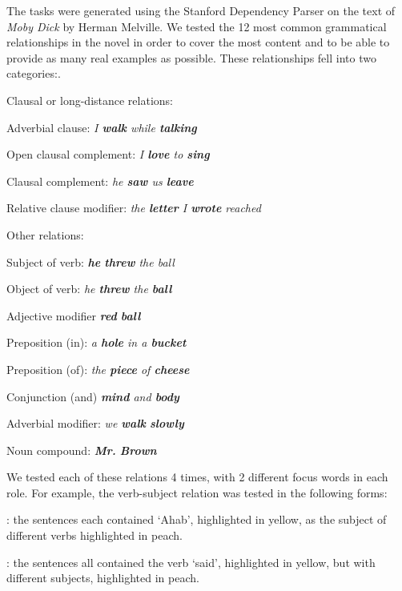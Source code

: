 The tasks were generated using the Stanford Dependency Parser \cite{de2006generating} on the text of \emph{Moby Dick} by Herman Melville. We tested the 12 most common grammatical relationships in the novel in order to cover the most content and to be able to provide as many real examples as possible. These relationships fell into two categories:.


Clausal or long-distance relations:
	\squishlist
		\item {} Adverbial clause: \emph{ I \textbf{walk} while \textbf{talking}}
		\item  {} Open clausal complement:  \emph{I \textbf{love} to \textbf{sing} }
		\item  {} Clausal complement:  \emph{ he \textbf{saw} us \textbf{leave}}
		\item  {} Relative clause modifier:  \emph{the \textbf{letter} I \textbf{wrote} reached }
	\squishend

Other relations:
		\squishlist
			\item {} Subject of verb: \emph{\textbf{he} \textbf{threw} the ball}
			\item {} Object of verb:  \emph{ he \textbf{threw} the \textbf{ball}}
			\item {} Adjective modifier \emph{\textbf{red} \textbf{ball}}
			\item {}  Preposition (in): \emph{a \textbf{hole} in a \textbf{bucket}}
			\item {}	Preposition (of):  \emph{ the \textbf{piece} of \textbf{cheese}}
			\item {}  Conjunction (and)  \emph{ \textbf{mind} and \textbf{body}}
		\item{} Adverbial modifier: \emph{  we \textbf{walk} \textbf{slowly}}
		\item {} Noun compound:  \emph{ \textbf{Mr.}  \textbf{Brown}}
	\squishend

We tested each of these relations 4 times, with 2 different focus words in each role. For example, the verb-subject relation  was tested in the following forms:
\squishlist
	\item {}:  the sentences each contained `Ahab', highlighted in yellow, as the subject of different verbs highlighted in peach.
	\item {}

	\item {}: the sentences all contained the verb `said', highlighted in yellow, but with different subjects, highlighted in peach.
	\item {}
\squishend

